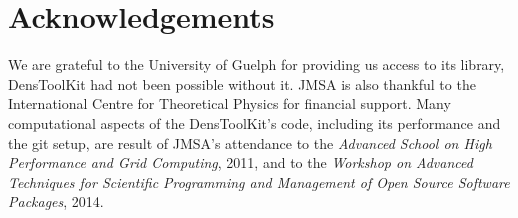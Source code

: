 \documentclass[12pt]{book}
\newcommand{\DTK}{Dens\-Tool\-Kit}
\begin{document}
\newpage\thispagestyle{empty}
\phantom{asd}

\vspace{50mm}

\section*{Acknowledgements}

We are grateful to the University of Guelph for providing us access to its library, \DTK{} 
had not been possible without it. JMSA is also thankful to the International Centre for 
Theoretical Physics for financial support. Many computational aspects of the \DTK's code, including its performance and the 
git setup, are result of JMSA's attendance to the \textit{Advanced School on High Performance 
and Grid Computing}, 2011, and to the \textit{Workshop on Advanced Techniques for Scientific 
Programming and Management of Open Source Software Packages}, 2014.

\newpage\thispagestyle{empty}
\phantom{asdf}

\tableofcontents

\mainmatter



%

%













\appendix


\end{document}
